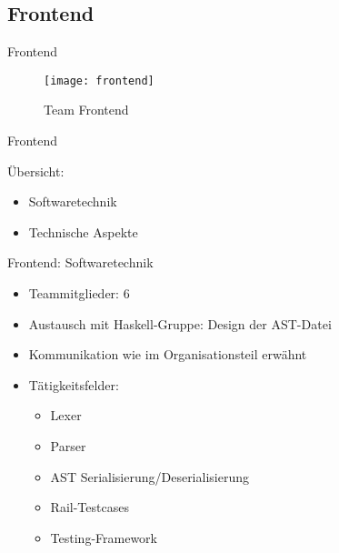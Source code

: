 \subsection{Frontend}

\begin{frame}{Frontend}

	\begin{figure}
	  \begin{center}
	    \leavevmode
	      \texttt{[image: frontend]}
	    \caption{Team Frontend}
	  \end{center}
	\end{figure}

\end{frame}

\begin{frame}{Frontend}

	\pause
	\"Ubersicht:
	\pause
	\begin{itemize}
		\item Softwaretechnik
		\pause
		\item Technische Aspekte
		\pause
	\end{itemize}

\end{frame}

\pagepreak


\begin{frame}{Frontend: Softwaretechnik}
	
	\pause
	\begin{itemize}
		\item Teammitglieder: 6
		\pause
		\item Austausch mit Haskell-Gruppe: Design der AST-Datei
		\pause
		\item Kommunikation wie im Organisationsteil erw\"ahnt
		\pause
		\item T\"atigkeitsfelder:
		\pause
		\begin{itemize}
			\item Lexer
			\pause
			\item Parser
			\pause
			\item AST Serialisierung/Deserialisierung
			\pause
			\item Rail-Testcases
			\pause
			\item Testing-Framework
		\end{itemize}
	\end{itemize}
	
\end{frame}

